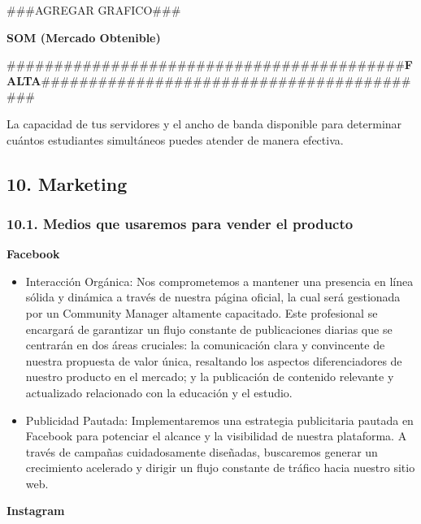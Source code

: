 \documentclass[
]{article}
\providecommand{\tightlist}{%
  \setlength{\itemsep}{0pt}\setlength{\parskip}{0pt}}
\begin{document}
\#\#\#AGREGAR GRAFICO\#\#\#

\textbf{SOM (Mercado Obtenible)}

\#\#\#\#\#\#\#\#\#\#\#\#\#\#\#\#\#\#\#\#\#\#\#\#\#\#\#\#\#\#\#\#\#\#\#\#\#\#\#\#\#\#\textbf{FALTA}\#\#\#\#\#\#\#\#\#\#\#\#\#\#\#\#\#\#\#\#\#\#\#\#\#\#\#\#\#\#\#\#\#\#\#\#\#\#\#\#\#\#

La capacidad de tus servidores y el ancho de banda disponible para
determinar cuántos estudiantes simultáneos puedes atender de manera
efectiva.

\newpage

\subsection{10. Marketing}\label{marketing}

\subsubsection{10.1. Medios que usaremos para vender el
producto}\label{medios-que-usaremos-para-vender-el-producto}

\textbf{Facebook}

\begin{itemize}
\tightlist
\item
  Interacción Orgánica: Nos comprometemos a mantener una presencia en
  línea sólida y dinámica a través de nuestra página oficial, la cual
  será gestionada por un Community Manager altamente capacitado. Este
  profesional se encargará de garantizar un flujo constante de
  publicaciones diarias que se centrarán en dos áreas cruciales: la
  comunicación clara y convincente de nuestra propuesta de valor única,
  resaltando los aspectos diferenciadores de nuestro producto en el
  mercado; y la publicación de contenido relevante y actualizado
  relacionado con la educación y el estudio.
\item
  Publicidad Pautada: Implementaremos una estrategia publicitaria
  pautada en Facebook para potenciar el alcance y la visibilidad de
  nuestra plataforma. A través de campañas cuidadosamente diseñadas,
  buscaremos generar un crecimiento acelerado y dirigir un flujo
  constante de tráfico hacia nuestro sitio web.
\end{itemize}

\textbf{Instagram}
\end{document}
